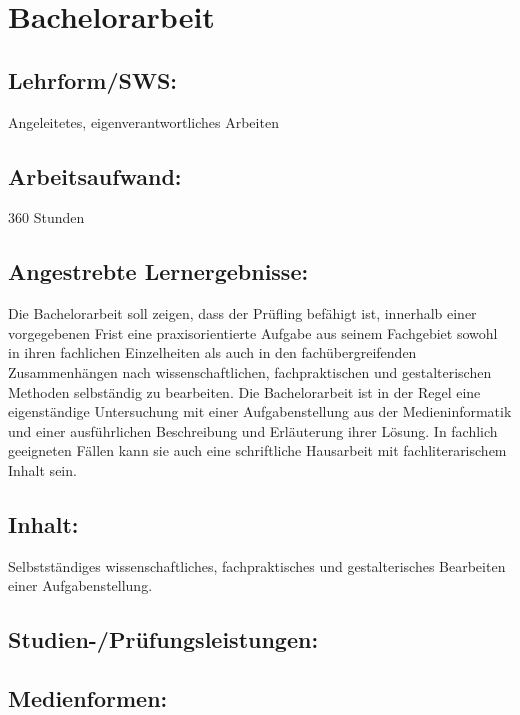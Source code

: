 \chapter{Bachelorarbeit}\label{bachelorarbeit}

\section{Lehrform/SWS:}\label{lehrformsws-3}

Angeleitetes, eigenverantwortliches Arbeiten

\section{Arbeitsaufwand:}\label{arbeitsaufwand-3}

360 Stunden

\section{Angestrebte
Lernergebnisse:}\label{angestrebte-lernergebnisse-3}

Die Bachelorarbeit soll zeigen, dass der Prüfling befähigt ist,
innerhalb einer vorgegebenen Frist eine praxisorientierte Aufgabe aus
seinem Fachgebiet sowohl in ihren fachlichen Einzelheiten als auch in
den fachübergreifenden Zusammenhängen nach wissenschaftlichen,
fachpraktischen und gestalterischen Methoden selbständig zu bearbeiten.
Die Bachelorarbeit ist in der Regel eine eigenständige Untersuchung mit
einer Aufgabenstellung aus der Medieninformatik und einer ausführlichen
Beschreibung und Erläuterung ihrer Lösung. In fachlich geeigneten Fällen
kann sie auch eine schriftliche Hausarbeit mit fachliterarischem Inhalt
sein.

\section{Inhalt:}\label{inhalt-3}

Selbstständiges wissenschaftliches, fachpraktisches und gestalterisches
Bearbeiten einer Aufgabenstellung.

\section{Studien-/Prüfungsleistungen:}\label{studien-pruxfcfungsleistungen-3}

\section{Medienformen:}\label{medienformen-3}

